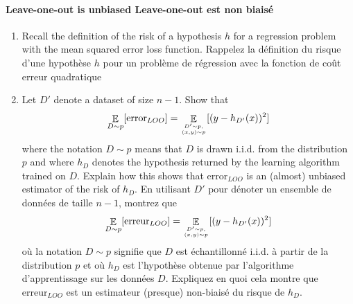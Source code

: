 \documentclass[11pt,french,english]{article}
\newcommand{\french}[1]{ {\color{blue} #1} }
\DeclareMathOperator*{\Esp}{\mathbb{E}}
\begin{document}
\begin{enumerate}
\paragraph{Leave-one-out is unbiased \french{Leave-one-out est non biaisé}}
\begin{enumerate}
    \item Recall the definition of the risk of a hypothesis $h$ for a regression problem with the mean squared error loss function. \french{Rappelez la définition du risque d'une hypothèse $h$ pour un problème de régression avec la fonction de coût erreur quadratique}
    \item Let $D'$ denote a dataset of size $n-1$. Show that
    $$\Esp_{D\sim  p }[\mathrm{error}_{LOO}] = \Esp_{D'\sim  p ,\atop (x,y)\sim  p }[(y-h_{D'}(x))^2]$$
where the notation $D\sim  p $ means that $D$ is drawn i.i.d. from the distribution $p$ and where $h_D$ denotes the hypothesis returned by the learning algorithm trained on $D$. Explain how this shows that $\mathrm{error}_{LOO}$ is an (almost) unbiased estimator of the risk of $h_D$. \french{En utilisant $D'$ pour dénoter un ensemble de données de taille $n-1$, montrez que
    $$\Esp_{D\sim  p }[\mathrm{erreur}_{LOO}] = \Esp_{D'\sim  p ,\atop (x,y)\sim  p }[(y-h_{D'}(x))^2]$$
où la notation $D\sim  p $ signifie que $D$ est échantillonné i.i.d. à partir de la distribution $p$ et où $h_D$ est l'hypothèse obtenue par l'algorithme d'apprentissage sur les données $D$. Expliquez en quoi cela montre que $\mathrm{erreur}_{LOO}$ est un estimateur (presque) non-biaisé du risque de $h_D$.}
\end{enumerate}

\end{enumerate}
\end{document}
